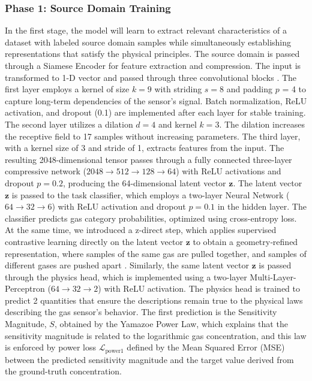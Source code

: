 \documentclass{IEEE_lsens}
\begin{document}
\subsubsection*{Phase 1: Source Domain Training}
In the first stage, the model will learn to extract relevant characteristics of a dataset with labeled source domain samples while simultaneously establishing representations that satisfy the physical principles. The source domain is passed through a Siamese Encoder for feature extraction and compression. The input is transformed to 1-D vector and passed through three convolutional blocks \cite{ige2024state}.
The first layer employs a kernel of size $k=9$ with striding $s=8$ and padding $p$ = 4 to capture long-term dependencies of the sensor's signal. Batch normalization, ReLU activation, and dropout (0.1) are implemented after each layer for stable training. The second layer utilizes a dilation $d=4$ and kernel $k=3$. The dilation increases the receptive field to 17 samples without increasing parameters. The third layer, with a kernel size of 3 and stride of 1, extracts features from the input.
The resulting 2048-dimensional tensor passes through a fully connected three-layer compressive network  ($2048 \rightarrow 512 \rightarrow 128 \rightarrow 64$) with ReLU activations and dropout $p=0.2$, producing the 64-dimensional latent vector $\textbf{z}$.
The latent vector $\textbf{z}$ is passed to the task classifier, which employs a two-layer Neural Network ($64 \rightarrow 32 \rightarrow 6$) with ReLU activation and dropout $p=0.1$ in the hidden layer. The classifier predicts gas category probabilities, optimized using cross-entropy loss. At the same time, we introduced a z-direct step, which applies supervised contrastive learning directly on the latent vector $\textbf{z}$ to obtain a geometry‑refined representation, where samples of the same gas are pulled together, and samples of different gases are pushed apart \cite{khosla2020supervised}.
Similarly, the same latent vector $\textbf{z}$ is passed through the physics head, which is implemented using a two-layer Multi-Layer-Perceptron ($64 \rightarrow 32 \rightarrow 2$) with ReLU activation. The physics head is trained to predict 2 quantities that ensure the descriptions remain true to the physical laws describing the gas sensor’s behavior. The first prediction is the Sensitivity Magnitude, $S$, obtained by the Yamazoe Power Law, which explains that the sensitivity magnitude is related to the logarithmic gas concentration\cite{hua2018theoretical}, and this law is enforced by power loss $\mathcal{L}_\text{power1}$ defined by the Mean Squared Error (MSE) between the predicted sensitivity magnitude and the target value derived from the ground-truth concentration.
\end{document}
